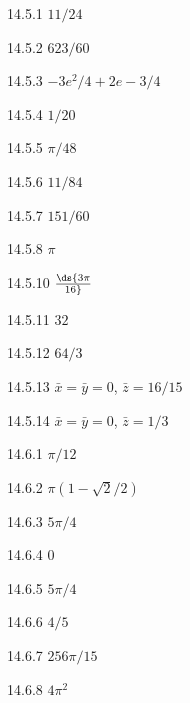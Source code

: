 \begin{Answer}{14.5.1}
$11/24$
\end{Answer}
\begin{Answer}{14.5.2}
$623/60$
\end{Answer}
\begin{Answer}{14.5.3}
$-3e^2/4+2e-3/4$
\end{Answer}
\begin{Answer}{14.5.4}
$1/20$
\end{Answer}
\begin{Answer}{14.5.5}
$\pi/48$
\end{Answer}
\begin{Answer}{14.5.6}
$11/84$
\end{Answer}
\begin{Answer}{14.5.7}
$151/60$
\end{Answer}
\begin{Answer}{14.5.8}
$\pi$
\end{Answer}
\begin{Answer}{14.5.10}
$\ds {3\pi\over16}$
\end{Answer}
\begin{Answer}{14.5.11}
$32$
\end{Answer}
\begin{Answer}{14.5.12}
$64/3$
\end{Answer}
\begin{Answer}{14.5.13}
$\bar x=\bar y=0$, $\bar z=16/15$
\end{Answer}
\begin{Answer}{14.5.14}
$\bar x=\bar y=0$, $\bar z=1/3$
\end{Answer}
\begin{Answer}{14.6.1}
$\pi/12$
\end{Answer}
\begin{Answer}{14.6.2}
$\pi(1-\sqrt2/2)$
\end{Answer}
\begin{Answer}{14.6.3}
$5\pi/4$
\end{Answer}
\begin{Answer}{14.6.4}
$0$
\end{Answer}
\begin{Answer}{14.6.5}
$5\pi/4$
\end{Answer}
\begin{Answer}{14.6.6}
$4/5$
\end{Answer}
\begin{Answer}{14.6.7}
$256\pi/15$
\end{Answer}
\begin{Answer}{14.6.8}
$4\pi^2$
\end{Answer}
